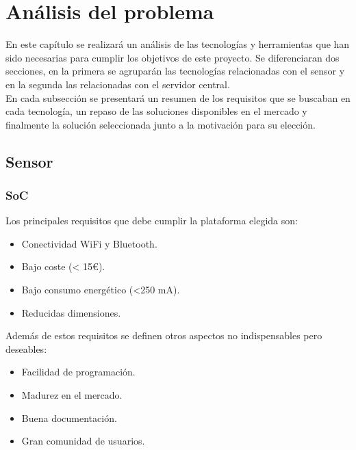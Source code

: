 \documentclass[../proyecto.tex]{subfiles}
\begin{document}
\chapter{Análisis del problema}\label{chap:analisis_del_problema}

En este capítulo se realizará un análisis de las tecnologías y herramientas que han sido necesarias para cumplir los objetivos de este proyecto. Se diferenciaran dos secciones, en la primera se agruparán las tecnologías relacionadas con el sensor y en la segunda las relacionadas con el servidor central.\\

En cada subsección se presentará un resumen de los requisitos que se buscaban en cada tecnología, un repaso de las soluciones disponibles en el mercado y finalmente la solución seleccionada junto a la motivación para su elección.\\


\section{Sensor}
\subsection{SoC}
Los principales requisitos que debe cumplir la plataforma elegida son:

\begin{itemize}
  \item Conectividad WiFi y Bluetooth.
  \item Bajo coste (< 15€).
  \item Bajo consumo energético (<250 mA).
  \item Reducidas dimensiones.
\end{itemize}

Además de estos requisitos se definen otros aspectos no indispensables pero deseables:

\begin{itemize}
  \item Facilidad de programación.
  \item Madurez en el mercado.
  \item Buena documentación.
  \item Gran comunidad de usuarios.
\end{itemize}
\end{document}
